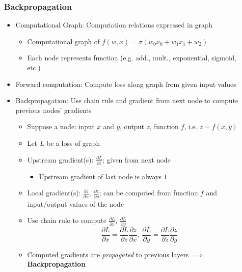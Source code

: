 \subsubsection*{Backpropagation}
\begin{itemize}
    \item Computational Graph: Computation relations expressed in graph
    \begin{figures}
    \end{figures}
    \begin{itemize}
        \item Computational graph of $f(w,x)=\sigma(w_0x_0+w_1x_1+w_2)$
        \item Each node represents function (e.g. add., mult., exponential, sigmoid, etc.)
    \end{itemize}
    \item Forward computation: Compute loss along graph from given input values
    \item Backpropagation: Use chain rule and gradient from next node to compute previous nodes' gradients
    \begin{itemize}
        \item Suppose a node: input $x$ and $y$, output $z$, function $f$, i.e. $z=f(x,y)$
        \item Let $L$ be a loss of graph
        \item Upstream gradient(s): $\frac{\partial L}{\partial z}$; given from next node
        \begin{itemize}
            \item Upstream gradient of last node is always $1$
        \end{itemize}
        \item Local gradient(s): $\frac{\partial z}{\partial x}$, $\frac{\partial z}{\partial y}$; can be computed from function $f$ and input/output values of the node
        \item Use chain rule to compute $\frac{\partial L}{\partial x}$, $\frac{\partial L}{\partial y}$
        \begin{equation}
            \frac{\partial L}{\partial x}=\frac{\partial L}{\partial z}\frac{\partial z}{\partial x},~\frac{\partial L}{\partial y}=\frac{\partial L}{\partial z}\frac{\partial z}{\partial y}
        \end{equation}
        \item Computed gradients are \textit{propagated} to previous layers $\implies$ \textbf{Backpropagation}

\end{itemize}
\end{itemize}

